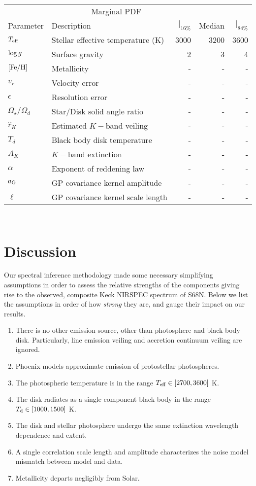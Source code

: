 \documentclass[twocolumn]{emulateapj}%
\begin{document}
~\clearpage

\begin{tabular}{lp{3cm}rrr}
\hline
\multicolumn{4}{c}{Marginal PDF} \\
\cline{3-5}
Parameter & Description & $|_{16\%}$& Median & $|_{84\%}$ \\
\hline
$T_\textrm{eff}$   & Stellar effective temperature  (K) &   3000 & 3200 & 3600  \\
$\log g$   & Surface gravity & 2 & 3 & 4 \\
$[{\rm Fe}/{\rm H}]$   & Metallicity & - & - & - \\
$v_r$   & Velocity error & - & - & - \\
$\epsilon$   & Resolution error & - & - & - \\
$\Omega_\star/\Omega_d$   & Star/Disk solid angle ratio  & - & - & - \\
$\hat r_K$   & Estimated $K-$band veiling  & - & - & - \\
$T_d$   & Black body disk temperature & - & - & - \\
$A_K$   & $K-$band extinction & - & - & - \\
$\alpha$   & Exponent of reddening law & - & - & - \\
$a_{\rm G}$   & GP covariance kernel amplitude & - & - & - \\
$\ell$   & GP covariance kernel scale length & - & - & - \\
\hline
\end{tabular}

~\clearpage


\section{Discussion}\label{sec:discussion}

Our spectral inference methodology made some necessary simplifying assumptions in order to assess the relative strengths of the components giving rise to the observed, composite Keck NIRSPEC spectrum of S68N.  Below we list the assumptions in order of how \emph{strong} they are, and gauge their impact on our results.  

\begin{enumerate}
\item There is no other emission source, other than photosphere and black body disk.  Particularly, line emission veiling and accretion continuum veiling are ignored.
\item Phoenix models approximate emission of protostellar photospheres.
\item The photospheric temperature is in the range $T_{\mathrm{eff}} \in [2700,3600]$ K.
\item The disk radiates as a single component black body in the range $T_\textrm{d} \in [1000,1500]$ K.
\item The disk and stellar photosphere undergo the same extinction wavelength dependence and extent.
\item A single correlation scale length and amplitude characterizes the noise model mismatch between model and data.
\item Metallicity departs negligibly from Solar.
\end{enumerate}
\end{document}
